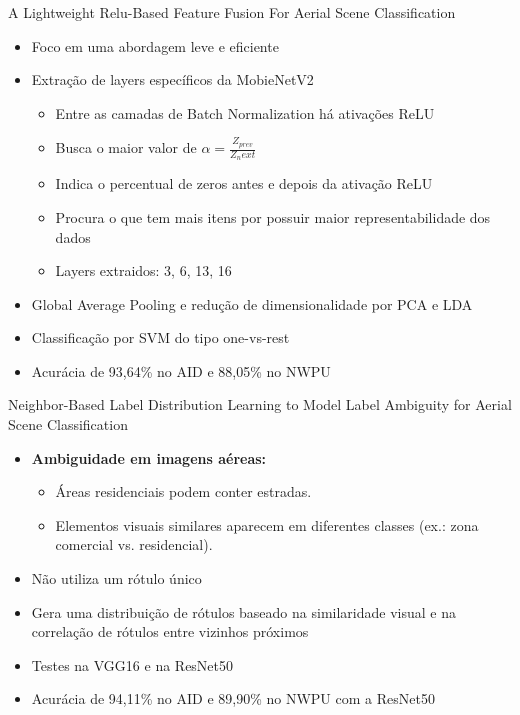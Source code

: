 \begin{frame}{A Lightweight Relu-Based Feature Fusion For Aerial Scene Classification}
    \begin{itemize}
        \item Foco em uma abordagem leve e eficiente
        \item Extração de layers específicos da MobieNetV2
        \begin{itemize}
            \item Entre as camadas de Batch Normalization há ativações ReLU
            \item Busca o maior valor de \(\alpha = \frac{Z_{prev}}{Z_next} \)
            \item Indica o percentual de zeros antes e depois da ativação ReLU
            \item Procura o que tem mais itens por possuir maior representabilidade dos dados
            \item Layers extraidos: 3, 6, 13, 16
        \end{itemize}
        
        \item Global Average Pooling e redução de dimensionalidade por PCA e LDA

        \item Classificação por SVM do tipo one-vs-rest

        \item Acurácia de 93,64\% no AID e 88,05\% no NWPU
    \end{itemize}
\end{frame}


\begin{frame}{Neighbor-Based Label Distribution Learning to Model Label Ambiguity for Aerial Scene Classification}
    \begin{itemize}
        \item \textbf{Ambiguidade em imagens aéreas:}
        \begin{itemize}
            \item Áreas residenciais podem conter estradas.
            \item Elementos visuais similares aparecem em diferentes classes (ex.: zona comercial vs. residencial).
        \end{itemize}
        \item Não utiliza um rótulo único
        \item Gera uma distribuição de rótulos baseado na similaridade visual e na correlação de rótulos entre vizinhos próximos
        \item Testes na VGG16 e na ResNet50
        \item Acurácia de 94,11\% no AID e 89,90\% no NWPU com a ResNet50
    \end{itemize}
\end{frame}

